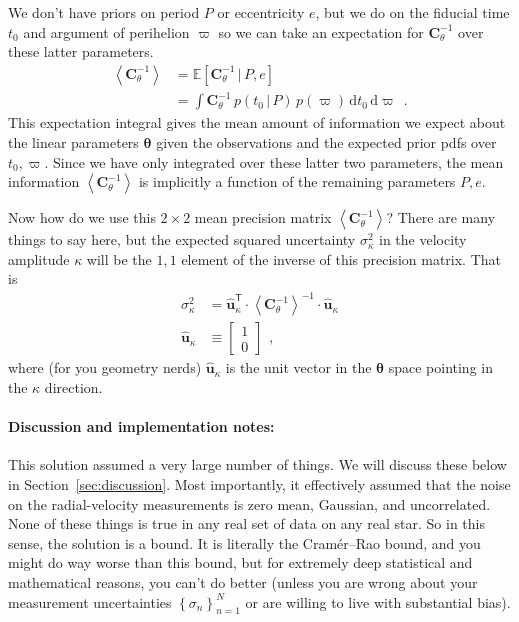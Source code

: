 \documentclass[10pt, letterpaper]{article}
\newcommand{\sectionname}{Section}
\newcommand{\hquad}{~~}
\newcommand{\given}{\,|\,}
\newcommand{\dd}{\mathrm{d}}
\newcommand{\T}{^{\!\mathsf{T}\!}}
\newcommand{\inv}{^{-1}}
\newcommand{\setof}[1]{\left\{{#1}\right\}}
\newcommand{\mean}[1]{\left<{#1}\right>}
\newcommand{\expectation}[1]{\mathbb{E}\!\left[{#1}\right]}
\renewcommand{\vector}[1]{\boldsymbol{#1}}
\newcommand{\vu}{\vector{\hat{u}}}
\newcommand{\vtheta}{\vector{\theta}}
\newcommand{\tensor}[1]{\mathbf{#1}}
\newcommand{\tC}{\tensor{C}}
\newcounter{marginnote}
\renewcommand{\footnote}[1]{\refstepcounter{marginnote}\textsuperscript{\themarginnote}\marginpar{\color{darkgray}\raggedright\footnotesize\textsuperscript{\themarginnote}#1}}
\begin{document}
We don't have priors on period $P$ or eccentricity $e$, but we do on
the fiducial time $t_0$ and argument of perihelion $\varpi$ so we can
take an expectation for $\tC_\theta\inv$ over these latter parameters.
\begin{align}
  \mean{\tC_\theta\inv} &= \expectation{\tC_\theta\inv\given P, e}
  \\
                        &= \int \tC_\theta\inv\,p(t_0\given P)\,p(\varpi)\,\dd t_0\,\dd\varpi
\hquad .
\end{align}
This expectation integral gives the mean amount of information we
expect about the linear parameters $\vtheta$ given the observations
and the expected prior pdfs over $t_0, \varpi$.
Since we have only integrated over these latter two parameters, the
mean information $\mean{\tC_\theta\inv}$ is implicitly a function of
the remaining parameters $P, e$.

Now how do we use this $2\times 2$ mean precision matrix
$\mean{\tC_\theta\inv}$?  There are many things to say here, but the
expected squared uncertainty $\sigma^2_\kappa$ in the velocity
amplitude $\kappa$ will be the $1,1$ element of the inverse of this
precision matrix.
That is
\begin{align}
  \sigma^2_\kappa &= \vu_\kappa\T\cdot\mean{\tC_\theta\inv}\inv\cdot\vu_\kappa
  \\
  \vu_\kappa &\equiv \left[\begin{array}{c} 1 \\ 0 \end{array}\right]
  \hquad,
\end{align}
where (for you geometry nerds) $\vu_\kappa$ is the unit vector in the
$\vtheta$ space pointing in the $\kappa$ direction.

\paragraph{Discussion and implementation notes:}
This solution assumed a very large number of things. We will discuss these
below in \sectionname~\ref{sec:discussion}. Most importantly, it effectively
assumed that the noise on the radial-velocity measurements is zero mean,
Gaussian, and uncorrelated. None of these things is true in any real
set of data on any real star. So in this sense, the solution is a bound.
It is literally the Cram\'er--Rao bound\footnote{HOGG CITE}, and you might
do way worse than this bound, but for extremely deep statistical and
mathematical reasons, you can't do better (unless you are wrong about your
measurement uncertainties $\setof{\sigma_n}_{n=1}^N$ or are willing to live
with substantial bias).
\end{document}
